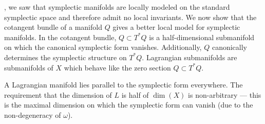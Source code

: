 

, we saw that symplectic manifolds are locally modeled on the standard symplectic space and therefore admit no local invariants. 
We now show that the cotangent bundle of a manifold $Q$ gives a better local model for symplectic manifolds.
In the cotangent bundle, $Q\subset T^*Q$ is a half-dimensional submanifold on which the canonical symplectic form vanishes.
Additionally, $Q$  canonically determines the symplectic structure on $T^*Q$.
Lagrangian submanifolds are submanifolds of $X$ which behave like the zero section $Q\subset T^*Q$.

A Lagrangian manifold lies parallel to the symplectic form everywhere.
The requirement that the dimension of $L$ is half of  $\dim(X)$ is non-arbitrary --- this is the maximal dimension on which the symplectic form can vanish (due to the non-degeneracy of $\omega$).



